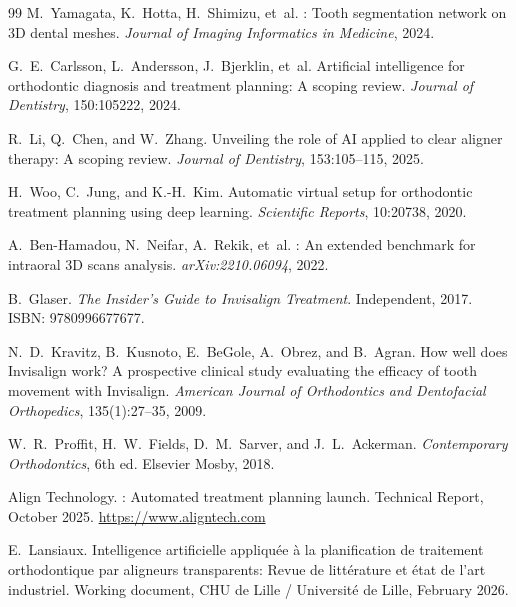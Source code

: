 \documentclass[10pt,twocolumn]{article}
\begin{document}
\begin{thebibliography}{99}
M.~Yamagata, K.~Hotta, H.~Shimizu, et~al.
: Tooth segmentation network on {3D} dental meshes.
\newblock \textit{Journal of Imaging Informatics in Medicine}, 2024.

G.~E.~Carlsson, L.~Andersson, J.~Bjerklin, et~al.
\newblock Artificial intelligence for orthodontic diagnosis and treatment
  planning: A scoping review.
\newblock \textit{Journal of Dentistry}, 150:105222, 2024.

R.~Li, Q.~Chen, and W.~Zhang.
\newblock Unveiling the role of {AI} applied to clear aligner therapy: A
  scoping review.
\newblock \textit{Journal of Dentistry}, 153:105--115, 2025.

H.~Woo, C.~Jung, and K.-H.~Kim.
\newblock Automatic virtual setup for orthodontic treatment planning using
  deep learning.
\newblock \textit{Scientific Reports}, 10:20738, 2020.

A.~Ben-Hamadou, N.~Neifar, A.~Rekik, et~al.
: An extended benchmark for intraoral {3D} scans analysis.
\newblock \textit{arXiv:2210.06094}, 2022.

B.~Glaser.
\newblock \textit{The Insider's Guide to Invisalign Treatment}.
\newblock Independent, 2017.
\newblock ISBN: 9780996677677.

N.~D.~Kravitz, B.~Kusnoto, E.~BeGole, A.~Obrez, and B.~Agran.
\newblock How well does Invisalign work? {A} prospective clinical study
  evaluating the efficacy of tooth movement with Invisalign.
\newblock \textit{American Journal of Orthodontics and Dentofacial Orthopedics},
  135(1):27--35, 2009.

W.~R.~Proffit, H.~W.~Fields, D.~M.~Sarver, and J.~L.~Ackerman.
\newblock \textit{Contemporary Orthodontics}, 6th ed.
\newblock Elsevier Mosby, 2018.

Align Technology.
: Automated treatment planning launch.
\newblock Technical Report, October 2025.
\newblock \url{https://www.aligntech.com}

E.~Lansiaux.
\newblock Intelligence artificielle appliquée à la planification de traitement
  orthodontique par aligneurs transparents: Revue de littérature et état de
  l'art industriel.
\newblock Working document, CHU de Lille / Université de Lille, February 2026.

\end{thebibliography}
\end{document}
